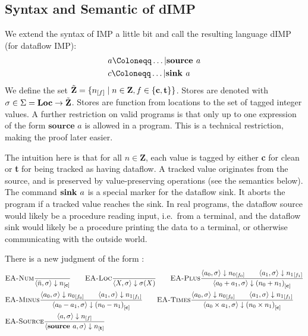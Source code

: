 \subsection{Syntax and Semantic of dIMP}
We extend the syntax of IMP a little bit
and call the resulting language dIMP (for dataflow IMP):
\begin{align*}
    &a \Coloneqq \dots | \defaultsource\\
    &c \Coloneqq \dots | \defaultsink\\
\end{align*}
We define the set $\tilde{\textbf{Z}} =\{\flagged{} \mid n \in \textbf{Z}, f \in \{\textbf{c}, \textbf{t}\}\}$.
Stores are denoted with $\sigma \in \Sigma = \textbf{Loc} \to \tilde{\textbf{Z}}$.
Stores are function from locations to the set of tagged integer
values.
A further restriction on valid programs is that only up to one expression
of the form $\textbf{source } a$ is allowed in a program.
This is a technical restriction, making the proof later easier.

The intuition here is that for all $n \in \textbf{Z}$, 
each value is tagged by either \textbf{c} for clean or \textbf{t} for being tracked
as having dataflow.
A tracked value originates from the source, and is preserved by value-preserving
operations (see the semantics below).
The command $\textbf{sink }{a}$ is a special marker for the dataflow sink.
It aborts the program if a tracked value reaches the sink.
In real programs, the dataflow source would likely be a procedure reading input,
i.e.\ from a terminal, and the dataflow sink would likely be a procedure 
printing the data to a terminal, or otherwise communicating with the outside world.


There is a new judgment of the form 
:
\begin{align*}
    &\bsrule{EA-Num}{}{\bigstep{\literalint}{\store}{\clean}} \qquad
    \bsrule{EA-Loc}{}{\bigstep{X}{\store}{\store(X)}}\qquad
    \bsrule{EA-Plus}
    {\bigstep{a_0}{\store}{\flagged[n_0][0]}
    \qquad \bigstep{a_1}{\store}{\flagged[n_1][1]}}
    {\bigstep{a_0+a_1}{\store}{\clean[(n_0+n_1)]}}\\
    &\bsrule{EA-Minus}
    {\bigstep{a_0}{\store}{\flagged[n_0][0]}
    \qquad \bigstep{a_1}{\store}{\flagged[n_1][1]}}
    {\bigstep{a_0-a_1}{\store}{\clean[(n_0-n_1)]}} \qquad
    \bsrule{EA-Times}
    {\bigstep{a_0}{\store}{\flagged[n_0][0]}
    \qquad \bigstep{a_1}{\store}{\flagged[n_1][1]}}
    {\bigstep{a_0 \times a_1}{\store}{\clean[(n_0 \times n_1)]}}\\
    &\bsrule{EA-Source}{\bigstep{a}{\store}{\flagged}}
    {\bigstep{\source{a}}{\store}{\tracked}}
\end{align*}


